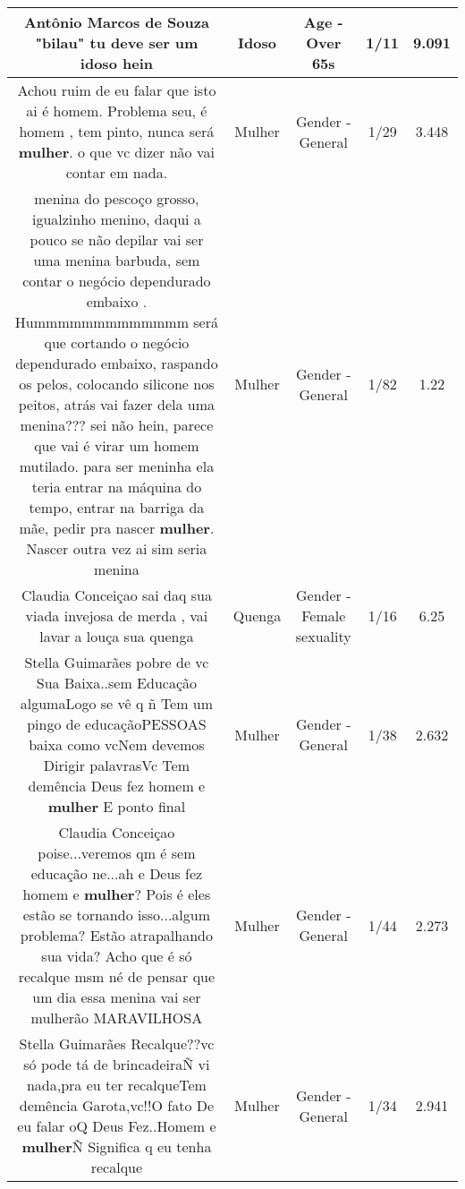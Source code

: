 \documentclass[11pt]{article}
\newlength\mylength
\begin{document}
\begin{center}
\begin{longtable}{|C{.65\mylength}|C{.30\mylength}|C{.12\mylength}|C{.12\mylength}|C{.12\mylength}|}
  \small Antônio Marcos de Souza "bilau" tu deve ser um \textbf{idoso} hein\normalsize   & Idoso & Age - Over 65s & 1/11 & 9.091 \\  \hline
  \small Achou ruim de eu falar que isto ai é homem. Problema seu, é homem , tem pinto, nunca será \textbf{mulher}. o que vc dizer não vai contar em nada.\normalsize   & Mulher & Gender - General & 1/29 & 3.448 \\  \hline
  \small menina do pescoço grosso, igualzinho menino, daqui a pouco se não depilar vai ser uma menina barbuda, sem contar o negócio dependurado embaixo . Hummmmmmmmmmmmm será que cortando o negócio dependurado embaixo, raspando os pelos, colocando silicone nos peitos, atrás vai fazer dela uma menina??? sei não hein, parece que vai é virar um homem mutilado.  para ser meninha ela teria entrar na máquina do tempo, entrar na barriga da mãe, pedir pra nascer \textbf{mulher}. Nascer outra vez ai sim seria menina\normalsize   & Mulher & Gender - General & 1/82 & 1.22 \\  \hline
  \small Claudia Conceiçao sai daq sua viada invejosa de merda , vai lavar a louça sua quenga\normalsize   & Quenga & Gender - Female sexuality & 1/16 & 6.25 \\  \hline
  \small Stella Guimarães pobre de vc Sua Baixa..sem Educação algumaLogo se vê q ñ Tem um pingo de educaçãoPESSOAS baixa como vcNem devemos Dirigir palavrasVc Tem demência Deus fez homem e \textbf{mulher} E ponto final\normalsize   & Mulher & Gender - General & 1/38 & 2.632 \\  \hline
  \small Claudia Conceiçao poise...veremos qm é sem educação ne...ah e Deus fez homem e \textbf{mulher}? Pois é eles estão se tornando isso...algum problema? Estão atrapalhando sua vida? Acho que é só recalque msm né de pensar que um dia essa menina vai ser mulherão MARAVILHOSA\normalsize   & Mulher & Gender - General & 1/44 & 2.273 \\  \hline
  \small Stella Guimarães Recalque??vc só pode tá de brincadeiraÑ vi nada,pra eu ter recalqueTem demência Garota,vc!!O fato De eu falar oQ Deus Fez..Homem e \textbf{mulher}Ñ Significa q eu tenha recalque\normalsize   & Mulher & Gender - General & 1/34 & 2.941 \\  \hline

\end{longtable}
\end{center}
\end{document}
